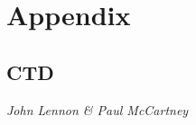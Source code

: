 \chapter{Appendix}

\section{CTD}

\textit{John Lennon \& Paul McCartney}

\vspace{1cm}

\lipsum[1] \citep{stull1988introduction}

\vspace{3cm}

